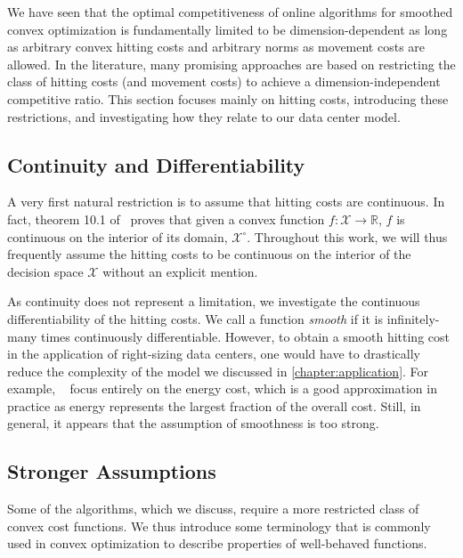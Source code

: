 We have seen that the optimal competitiveness of online algorithms for smoothed convex optimization is fundamentally limited to be dimension-dependent as long as arbitrary convex hitting costs and arbitrary norms as movement costs are allowed. In the literature, many promising approaches are based on restricting the class of hitting costs (and movement costs) to achieve a dimension-independent competitive ratio. This section focuses mainly on hitting costs, introducing these restrictions, and investigating how they relate to our data center model.

\subsection{Continuity and Differentiability}\label{section:theory:beyond_convexity:continuity_and_differentiability}

A very first natural restriction is to assume that hitting costs are continuous. In fact, theorem 10.1 of~\cite{Rockafellar1970} proves that given a convex function $f : \mathcal{X} \to \mathbb{R}$, $f$ is continuous on the interior of its domain, $\mathcal{X}^{\circ}$. Throughout this work, we will thus frequently assume the hitting costs to be continuous on the interior of the decision space $\mathcal{X}$ without an explicit mention.

As continuity does not represent a limitation, we investigate the continuous differentiability of the hitting costs. We call a function \emph{smooth} if it is infinitely-many times continuously differentiable. However, to obtain a smooth hitting cost in the application of right-sizing data centers, one would have to drastically reduce the complexity of the model we discussed in \cref{chapter:application}. For example, \citeauthor*{Bansal2015}~\cite{Bansal2015} focus entirely on the energy cost, which is a good approximation in practice as energy represents the largest fraction of the overall cost. Still, in general, it appears that the assumption of smoothness is too strong.

\subsection{Stronger Assumptions}

Some of the algorithms, which we discuss, require a more restricted class of convex cost functions. We thus introduce some terminology that is commonly used in convex optimization to describe properties of well-behaved functions.

